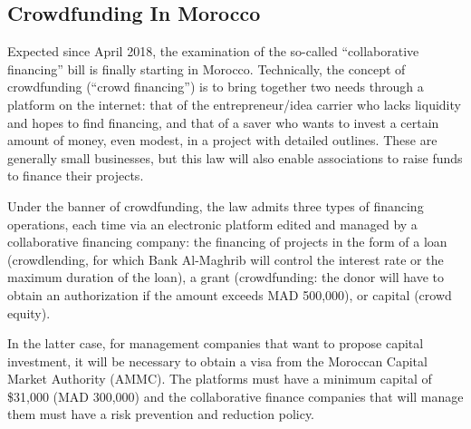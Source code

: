 \subsection*{ Crowdfunding In Morocco }
Expected since April 2018, the examination of the so-called “collaborative financing” bill is finally starting in Morocco. Technically, the concept of crowdfunding (“crowd financing”) is to bring together two needs through a platform on the internet: that of the entrepreneur/idea carrier who lacks liquidity and hopes to find financing, and that of a saver who wants to invest a certain amount of money, even modest, in a project with detailed outlines. These are generally small businesses, but this law will also enable associations to raise funds to finance their projects.

Under the banner of crowdfunding, the law admits three types of financing operations, each time via an electronic platform edited and managed by a collaborative financing company: the financing of projects in the form of a loan (crowdlending, for which Bank Al-Maghrib will control the interest rate or the maximum duration of the loan), a grant (crowdfunding: the donor will have to obtain an authorization if the amount exceeds MAD 500,000), or capital (crowd equity).

In the latter case, for management companies that want to propose capital investment, it will be necessary to obtain a visa from the Moroccan Capital Market Authority (AMMC). The platforms must have a minimum capital of \$31,000 (MAD 300,000) and the collaborative finance companies that will manage them must have a risk prevention and reduction policy.

